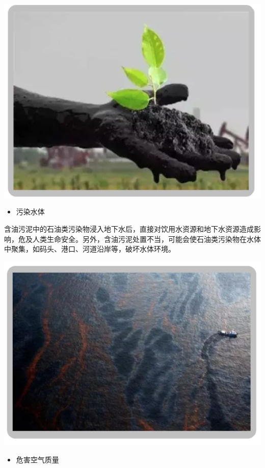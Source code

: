 \documentclass[]{book}
\providecommand{\tightlist}{%
  \setlength{\itemsep}{0pt}\setlength{\parskip}{0pt}}
\begin{document}
\includegraphics[width=8.33in]{images/youni5}

\begin{itemize}
\tightlist
\item
  污染水体
\end{itemize}

含油污泥中的石油类污染物浸入地下水后，直接对饮用水资源和地下水资源造成影响，危及人类生命安全。另外，含油污泥处置不当，可能会使石油类污染物在水体中聚集，如码头、港口、河道沿岸等，破坏水体环境。

\includegraphics[width=8.33in]{images/youni6}

\begin{itemize}
\tightlist
\item
  危害空气质量
\end{itemize}
\end{document}
